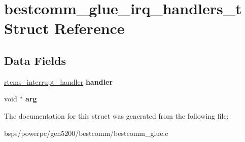 \hypertarget{structbestcomm__glue__irq__handlers__t}{}\section{bestcomm\+\_\+glue\+\_\+irq\+\_\+handlers\+\_\+t Struct Reference}
\label{structbestcomm__glue__irq__handlers__t}
\subsection*{Data Fields}
\begin{DoxyCompactItemize}
\item 
\mbox{\label{structbestcomm__glue__irq__handlers__t_a2999e084e51687c03fc9211fefc25347}} 
\mbox{\hyperlink{group__rtems__interrupt__extension_gab39bd096ab2c3b41d03dace0e9777b08}{rtems\+\_\+interrupt\+\_\+handler}} {\bfseries handler}
\item 
\mbox{\label{structbestcomm__glue__irq__handlers__t_a3f11f6487b7e0c1deef07373db46f54b}} 
void $\ast$ {\bfseries arg}
\end{DoxyCompactItemize}


The documentation for this struct was generated from the following file\+:\begin{DoxyCompactItemize}
\item 
bsps/powerpc/gen5200/bestcomm/bestcomm\+\_\+glue.\+c\end{DoxyCompactItemize}
